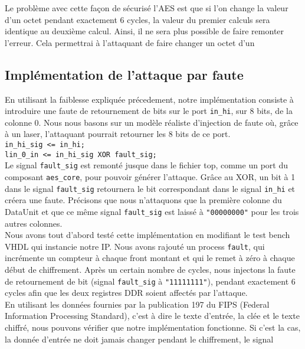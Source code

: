 Le problème avec cette façon de sécurisé l'AES est que si l'on change la valeur d'un octet pendant exactement 6 cycles, la valeur du premier calculs sera identique au deuxième calcul.
Ainsi, il ne sera plus possible de faire remonter l'erreur. Cela permettrai à l'attaquant de faire changer un octet d'un

\subsection{Implémentation de l'attaque par faute}

En utilisant la faiblesse expliquée précedement, notre implémentation
consiste à introduire une faute de retournement de bits sur le port
\texttt{in\_hi}, sur 8 bits, de la colonne 0.
Nous nous basons sur un
modèle réaliste d'injection de faute où, grâce à un laser, l'attaquant
pourrait retourner les 8 bits de ce port.\\
\texttt{in\_hi\_sig <= in\_hi;\\  lin\_0\_in <= in\_hi\_sig XOR fault\_sig;} \\
Le signal \texttt{fault\_sig} est remonté jusque dans le fichier top, comme un
port du composant \texttt{aes\_core}, pour pouvoir générer l'attaque.
Grâce au XOR,
un bit à 1 dans le signal \texttt{fault\_sig} retournera le bit correspondant
dans le signal \texttt{in\_hi} et créera une faute.
Précisons que nous n'attaquons que la première colonne du DataUnit et que ce
même signal \texttt{fault\_sig} est laissé à \texttt{"00000000"} pour les trois
autres colonnes. \\
Nous avons tout d'abord testé cette implémentation en modifiant le test bench
VHDL qui instancie notre IP. Nous avons rajouté un process \texttt{fault},
qui incrémente un compteur à chaque front montant et qui le remet à zéro à
chaque début de chiffrement. Après un certain nombre de cycles, nous injectons
la faute de retournement de bit (signal \texttt{fault\_sig} à  \texttt{"11111111"}),
pendant exactement 6 cycles afin que les deux registres DDR soient affectés par
l'attaque. \\
En utilisant les données fournies par la publication 197 du FIPS (Federal Information
Processing Standard), c'est à dire le texte d'entrée, la clée et le texte chiffré,
nous pouvons vérifier que notre implémentation fonctionne. Si c'est la cas,
la donnée d'entrée ne doit jamais changer pendant le chiffrement, le signal
